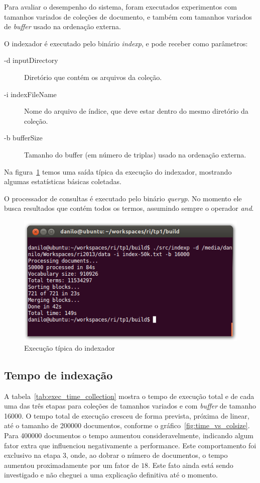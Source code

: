 \documentclass[12pt]{article}
\begin{document}
Para avaliar o desempenho do sistema, foram executados experimentos com tamanhos variados de coleções de documento, e também com tamanhos variados de \emph{buffer} usado na ordenação externa.

O indexador é executado pelo binário \emph{indexp}, e pode receber como parâmetros:
\begin{description}
\item[-d inputDirectory] Diretório que contém os arquivos da coleção.
\item[-i indexFileName] Nome do arquivo de índice, que deve estar dentro do mesmo diretório da coleção.
\item[-b bufferSize] Tamanho do buffer (em número de triplas) usado na ordenação externa.
\end{description}

Na figura~\ref{fig:indexp} temos uma saída típica da execução do indexador, mostrando algumas estatísticas básicas coletadas.

O processador de consultas é executado pelo binário \emph{queryp}. No momento ele busca resultados que contém todos os termos, assumindo sempre o operador \emph{and}.


\begin{figure}[ht]
\centering
\includegraphics[width=.8\textwidth]{indexp-output.png}
\caption{Execução típica do indexador}
\label{fig:indexp}
\end{figure}

\subsection{Tempo de indexação}\label{sec:time}

A tabela~\ref{tab:exec_time_collection} mostra o tempo de execução total e de cada uma das três etapas para coleções de tamanhos variados e com \emph{buffer} de tamanho 16000. O tempo total de execução cresceu de forma prevista, próxima de linear, até o tamanho de 200000 documentos, conforme o gráfico~\ref{fig:time_vs_colsize}. Para 400000 documentos o tempo aumentou consideravelmente, indicando algum fator extra que influenciou negativamente a performance. Este comportamento foi exclusivo na etapa 3, onde, ao dobrar o número de documentos, o tempo aumentou proximadamente por um fator de $18$. Este fato ainda está sendo investigado e não cheguei a uma explicação definitiva até o momento.
\end{document}
